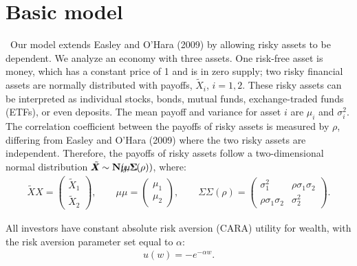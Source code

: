 \documentclass[10pt]{article}
\begin{document}
\section{Basic model}

\quad \
Our model extends Easley and O'Hara (2009) by allowing risky assets to be dependent. We analyze an economy with three assets. One risk-free asset is money, which has a constant price of 1 and is in zero supply; two risky financial assets are normally distributed with payoffs, $ \tilde X_i $, $ i = 1, 2 $. These risky assets can be interpreted as individual stocks, bonds, mutual funds, exchange-traded funds (ETFs), or even deposits. The mean payoff and variance for asset $i$ are $ \mu_i $ and $ \sigma_i^2 $. The correlation coefficient between the payoffs of risky assets is measured by $ \rho $, differing from Easley and O'Hara (2009) where the two risky assets are independent. Therefore, the payoffs of risky assets follow a two-dimensional normal distribution $ \tilde X \!\!\!\!\!\! X \sim {\bf N} (\mu \!\!\!\!\!\! \mu, \Sigma \!\!\!\!\! \Sigma (\rho)) $, where:
\begin{eqnarray*}
\tilde X \!\!\!\!\!\! X = \left( \begin{matrix} \tilde X_1 \\ \tilde X_2 \end{matrix} \right), \qquad \mu \!\!\!\!\!\! \mu = \left( \begin{matrix} \mu_1 \\ \mu_2 \end{matrix} \right), \qquad \Sigma \!\!\!\!\! \Sigma (\rho) = \left( \begin{matrix} \sigma_1^2 & \rho \sigma_1 \sigma_2 \\ \rho \sigma_1 \sigma_2 & \sigma_2^2 \end{matrix} \right).
\end{eqnarray*}

All investors have constant absolute risk aversion (CARA) utility for wealth, with the risk aversion parameter set equal to $ \alpha $:
\begin{eqnarray}
u (w) = - e^{- \alpha w}.
\end{eqnarray}
\end{document}
